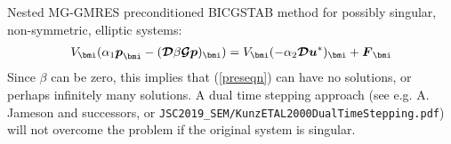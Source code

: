 
\usepackage{graphicx}

\usepackage{exscale,times}
\usepackage{amsmath}
\usepackage{amssymb}
\usepackage{mathtools}

\usepackage{bm}


\newcommand{\bmomega}{\mbox{\boldmath $\omega$\unboldmath}}
\newcommand{\bmupsilon}{\mbox{\boldmath $\upsilon$\unboldmath}}
\newcommand{\bmp}{\mbox{\boldmath $p$\unboldmath}}
\newcommand{\bmC}{\mbox{\boldmath $C$\unboldmath}}
\newcommand{\bmr}{\mbox{\boldmath $r$\unboldmath}}
\newcommand{\bms}{\mbox{\boldmath $s$\unboldmath}}
\newcommand{\bmg}{\mbox{\boldmath $g$\unboldmath}}
\newcommand{\bmq}{\mbox{\boldmath $q$\unboldmath}}
\newcommand{\bmU}{\mbox{\boldmath $U$\unboldmath}}
\newcommand{\bmu}{\mbox{\boldmath $u$\unboldmath}}
\newcommand{\bmm}{\mbox{\boldmath $m$\unboldmath}}
\newcommand{\bmj}{\mbox{\boldmath $j$\unboldmath}}
\newcommand{\bmk}{\mbox{\boldmath $k$\unboldmath}}
\newcommand{\bmX}{\mbox{\boldmath $X$\unboldmath}}
\newcommand{\bma}{\mbox{\boldmath $a$\unboldmath}}
\newcommand{\bmv}{\mbox{\boldmath $v$\unboldmath}}
\newcommand{\bmx}{\mbox{\boldmath $x$\unboldmath}}
\newcommand{\bmy}{\mbox{\boldmath $y$\unboldmath}}
\newcommand{\bmn}{\mbox{\boldmath $n$\unboldmath}}
\newcommand{\bmN}{\mbox{\boldmath $N$\unboldmath}}
\newcommand{\bmf}{\mbox{\boldmath $f$\unboldmath}}
\newcommand{\bmF}{\mbox{\boldmath $F$\unboldmath}}
\newcommand{\bmS}{\mbox{\boldmath $S$\unboldmath}}
\newcommand{\bmG}{\mbox{\boldmath $G$\unboldmath}}
\newcommand{\bmV}{\mbox{\boldmath $V$\unboldmath}}
\newcommand{\bmI}{\mbox{\boldmath $I$\unboldmath}}
\newcommand{\bmD}{\mbox{\boldmath $D$\unboldmath}}
\newcommand{\bmdC}{\mbox{\boldmath $dC$\unboldmath}}
\newcommand{\bmdq}{\mbox{\boldmath $dq$\unboldmath}}
\newcommand{\bmL}{\mbox{\boldmath $L$\unboldmath}}
\newcommand{\bmOmega}{\mbox{\boldmath $\Omega$\unboldmath}}
\newcommand{\bmphi}{\mbox{\boldmath $\phi$\unboldmath}}
\newcommand{\bmnu}{\mbox{\boldmath $\nu$\unboldmath}}

\newcommand{\DOP}{\mbox{\boldmath $\cal D$\unboldmath}}
\newcommand{\GOP}{\mbox{\boldmath $\cal G$\unboldmath}}



Nested MG-GMRES preconditioned BICGSTAB method for possibly 
singular, non-symmetric, elliptic systems:
\begin{eqnarray}
V_{\bmi} (\alpha_{1} \bmp_{\bmi} - (\DOP \beta \GOP \bmp)_{\bmi}) = 
V_{\bmi} ( -\alpha_{2} \DOP \bmu^{\ast} )_{\bmi} + \bmF_{\bmi}
\label{preseqn}
\end{eqnarray}
Since $\beta$ can be zero, this implies that (\ref{preseqn}) can
have no solutions, or perhaps infinitely many solutions.  A
dual time stepping approach (see e.g. A. Jameson and successors, or
\verb=JSC2019_SEM/KunzETAL2000DualTimeStepping.pdf=) will not
overcome the problem if the original system is singular.

